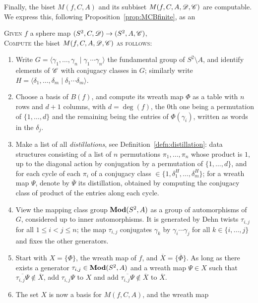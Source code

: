 \documentclass{amsart}
\begin{document}
Finally, the biset $M(f,C,A)$ and its subbiset $M(f,C,A,{\mathscr D},{\mathscr C})$ are
computable. We express this, following
Proposition~\ref{prop:MCBfinite}, as an
\begin{algo}\label{algo:compute M(f,C,A)}
  \textsc{Given} $f$ a sphere map $(S^2,C,{\mathscr D})\to(S^2,A,{\mathscr C})$,\\
  \textsc{Compute} the biset  $M(f,C,A,{\mathscr D},{\mathscr C})$ \textsc{as follows:}\upshape
  \begin{enumerate}
  \item Write
    $G=\langle\gamma_1,\dots,\gamma_n\mid\gamma_1\cdots\gamma_n\rangle$
    the fundamental group of $S^2\setminus A$, and identify elements
    of ${\mathscr C}$ with conjugacy classes in $G$; similarly write
    $H=\langle\delta_1,\dots,\delta_m\mid\delta_1\cdots\delta_m\rangle$.
  \item Choose a basis of $B(f)$, and compute its wreath map $\Phi$ as
    a table with $n$ rows and $d+1$ columns, with $d=\deg(f)$, the
    $0$th one being a permutation of $\{1,\dots,d\}$ and the remaining
    being the entries of $\Phi(\gamma_i)$, written as words in the
    $\delta_j$.
  \item Make a list of all \emph{distillations}, see
    Definition~\ref{defn:distillation}: data structures consisting of
    a list of $n$ permutations $\pi_1,\dots,\pi_n$ whose product is
    $1$, up to the diagonal action by conjugation by a permutation of
    $\{1,\dots,d\}$, and for each cycle of each $\pi_i$ of a conjugacy
    class $\in\{1,\delta_1^H,\dots,\delta_m^H\}$; for a wreath map
    $\Psi$, denote by $\overline\Psi$ its distillation, obtained by
    computing the conjugacy class of product of the entries along each
    cycle.
  \item View the mapping class group $\mathbf{\relax Mod}(S^2,A)$ as a group of
    automorphisms of $G$, considered up to inner automorphisms. It is
    generated by Dehn twists $\tau_{i,j}$ for all $1\le i<j\le n$; the
    map $\tau_{i,j}$ conjugates $\gamma_k$ by $\gamma_i\cdots\gamma_j$
    for all $k\in\{i,\dots,j\}$ and fixes the other generators.
  \item Start with $X=\{\Phi\}$, the wreath map of $f$, and
    $\overline X=\{\overline\Phi\}$. As long as there exists a
    generator $\tau_{i,j}\in\mathbf{\relax Mod}(S^2,A)$ and a wreath map
    $\Psi\in X$ such that
    $\overline{\tau_{i,j}\Psi}\notin\overline X$, add
    $\tau_{i,j}\Psi$ to $X$ and add
    $\overline{\tau_{i,j}\Psi}\notin\overline X$ to $\overline X$.
  \item The set $X$ is now a basis for $M(f,C,A)$, and the wreath map

\end{enumerate}
\end{algo}
\end{document}
